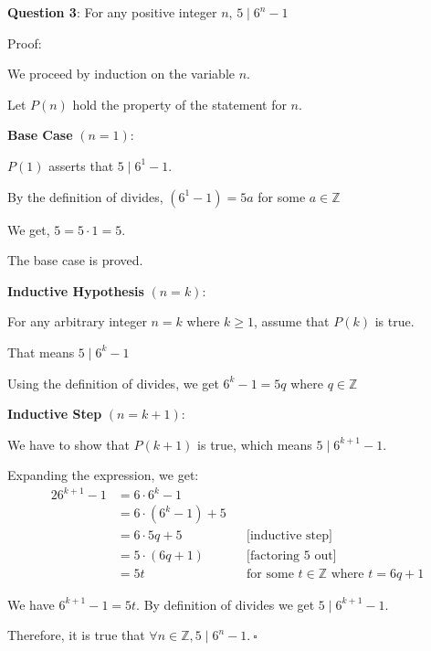 \documentclass{article} %
\newcommand{\question}[2][]{\begin{flushleft}
        \textbf{Question #1}: #2

\end{flushleft}}
\begin{document}
    \question[3]{For any positive integer $n$, $5 \mid 6^n - 1$}

    Proof:

    We proceed by induction on the variable $n$.

    Let $P(n)$ hold the property of the statement for $n$.

    \textbf{Base Case} $(n = 1)$:

    $P(1)$ asserts that $5 \mid 6^1 - 1$.

    By the definition of divides, $(6^1 - 1) = 5a$ for some $a \in \mathbb{Z}$

    We get, $5 = 5 \cdot 1 = 5$.

    The base case is proved.

    \textbf{Inductive Hypothesis} $(n = k)$:

    For any arbitrary integer $n = k$ where $k \geq 1$, assume that $P(k)$ is true.

    That means $5 \mid 6^k - 1$

    Using the definition of divides, we get $6^k - 1 = 5q$ where $q \in \mathbb{Z}$

    \textbf{Inductive Step} $(n = k + 1)$:

    We have to show that $P(k + 1)$ is true, which means $5 \mid 6^{k + 1} - 1$.

    Expanding the expression, we get:
    \begin{alignat*}{2}
        6^{k + 1} - 1 &= 6 \cdot 6^k - 1 \\
        &=6 \cdot (6^k - 1) + 5\\
        &=6 \cdot 5q + 5&& \text{[inductive step]}\\
        &=5 \cdot (6q + 1)&& \text{[factoring 5 out]} \\
        &=5t&& \text{for some $t \in \mathbb{Z}$ where $t = 6q + 1$}
    \end{alignat*}

    We have  $6^{k + 1} - 1 = 5t$. By definition of divides we get  $5 \mid 6^{k + 1} - 1$.

    Therefore, it is true that $\forall n \in \mathbb{Z}, 5 \mid 6^n - 1.\ \square$ 

    \newpage

                                                                   
\end{document}
